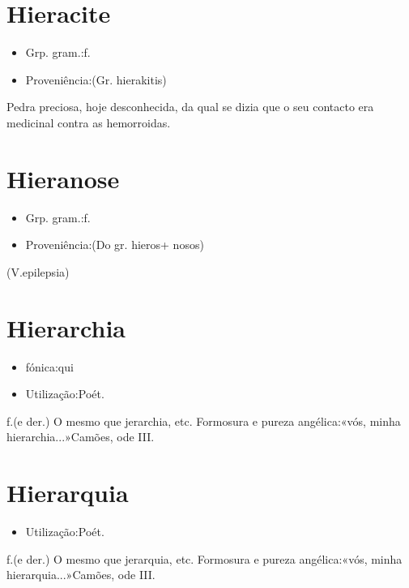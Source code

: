 \documentclass{article}
\begin{document}
\section{Hieracite}
\begin{itemize}
\item {Grp. gram.:f.}
\end{itemize}
\begin{itemize}
\item {Proveniência:(Gr. \textunderscore hierakitis\textunderscore )}
\end{itemize}
Pedra preciosa, hoje desconhecida, da qual se dizia que o seu contacto era medicinal contra as hemorroidas.
\section{Hieranose}
\begin{itemize}
\item {Grp. gram.:f.}
\end{itemize}
\begin{itemize}
\item {Proveniência:(Do gr. \textunderscore hieros\textunderscore  + \textunderscore nosos\textunderscore )}
\end{itemize}
(V.epilepsia)
\section{Hierarchia}
\begin{itemize}
\item {fónica:qui}
\end{itemize}
\begin{itemize}
\item {Utilização:Poét.}
\end{itemize}
\textunderscore f.\textunderscore  (e der.)
O mesmo que \textunderscore jerarchia\textunderscore , etc.
Formosura e pureza angélica:«\textunderscore vós, minha hierarchia...\textunderscore »Camões, ode III.
\section{Hierarquia}
\begin{itemize}
\item {Utilização:Poét.}
\end{itemize}
\textunderscore f.\textunderscore  (e der.)
O mesmo que \textunderscore jerarquia\textunderscore , etc.
Formosura e pureza angélica:«\textunderscore vós, minha hierarquia...\textunderscore »Camões, ode III.
\end{document}
